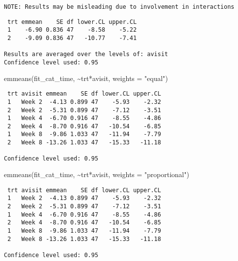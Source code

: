 \documentclass[
  letterpaper,
  DIV=11,
  numbers=noendperiod]{scrreprt}
\newenvironment{Shaded}{\begin{snugshade}}{\end{snugshade}}
\newcommand{\AttributeTok}[1]{\textcolor[rgb]{0.40,0.45,0.13}{#1}}
\newcommand{\FunctionTok}[1]{\textcolor[rgb]{0.28,0.35,0.67}{#1}}
\newcommand{\NormalTok}[1]{\textcolor[rgb]{0.00,0.23,0.31}{#1}}
\newcommand{\SpecialCharTok}[1]{\textcolor[rgb]{0.37,0.37,0.37}{#1}}
\newcommand{\StringTok}[1]{\textcolor[rgb]{0.13,0.47,0.30}{#1}}
\begin{document}
\begin{verbatim}
NOTE: Results may be misleading due to involvement in interactions
\end{verbatim}

\begin{verbatim}
 trt emmean    SE df lower.CL upper.CL
 1    -6.90 0.836 47    -8.58    -5.22
 2    -9.09 0.836 47   -10.77    -7.41

Results are averaged over the levels of: avisit 
Confidence level used: 0.95 
\end{verbatim}

\begin{Shaded}
\begin{Highlighting}[]
\FunctionTok{emmeans}\NormalTok{(fit\_cat\_time, }\SpecialCharTok{\textasciitilde{}}\NormalTok{trt}\SpecialCharTok{*}\NormalTok{avisit, }\AttributeTok{weights =} \StringTok{"equal"}\NormalTok{)}
\end{Highlighting}
\end{Shaded}

\begin{verbatim}
 trt avisit emmean    SE df lower.CL upper.CL
 1   Week 2  -4.13 0.899 47    -5.93    -2.32
 2   Week 2  -5.31 0.899 47    -7.12    -3.51
 1   Week 4  -6.70 0.916 47    -8.55    -4.86
 2   Week 4  -8.70 0.916 47   -10.54    -6.85
 1   Week 8  -9.86 1.033 47   -11.94    -7.79
 2   Week 8 -13.26 1.033 47   -15.33   -11.18

Confidence level used: 0.95 
\end{verbatim}

\begin{Shaded}
\begin{Highlighting}[]
\FunctionTok{emmeans}\NormalTok{(fit\_cat\_time, }\SpecialCharTok{\textasciitilde{}}\NormalTok{trt}\SpecialCharTok{*}\NormalTok{avisit, }\AttributeTok{weights =} \StringTok{"proportional"}\NormalTok{)}
\end{Highlighting}
\end{Shaded}

\begin{verbatim}
 trt avisit emmean    SE df lower.CL upper.CL
 1   Week 2  -4.13 0.899 47    -5.93    -2.32
 2   Week 2  -5.31 0.899 47    -7.12    -3.51
 1   Week 4  -6.70 0.916 47    -8.55    -4.86
 2   Week 4  -8.70 0.916 47   -10.54    -6.85
 1   Week 8  -9.86 1.033 47   -11.94    -7.79
 2   Week 8 -13.26 1.033 47   -15.33   -11.18

Confidence level used: 0.95 
\end{verbatim}
\end{document}
